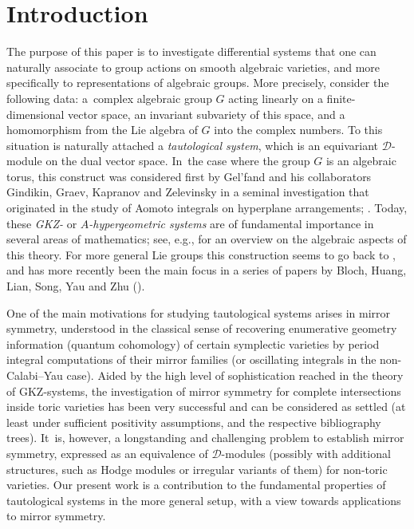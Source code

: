 \section{Introduction} \label{sec:intro}

The purpose of this paper is to investigate differential systems that
one can naturally associate to group actions on smooth algebraic
varieties, and more specifically to representations of algebraic
groups. More precisely, consider
the following data: a~complex algebraic group $G$
acting linearly on a finite-dimensional vector space, an invariant
subvariety of this space, and a homomorphism from the Lie algebra of
$G$ into the complex numbers. To this situation is naturally
attached a \emph{tautological system}, which is an equivariant
$\mathscr{D}$\nobreakdash-mod\-ule on the dual vector space. In~the case where the group $G$
is an algebraic torus, this construct
was considered first by Gel'fand and his collaborators
Gindikin, Graev, Kapranov and Zelevinsky in a seminal investigation
that originated in the study of Aomoto integrals on hyperplane
arrangements; \cf \cite{GGG80,GG86,GZ86,GGZ87,GKZ89,GKZ90}. Today,
these \emph{GKZ-} or \emph{$A$-hypergeometric systems} are of
fundamental importance in several areas of mathematics; see, e.g.,
\cite{GKZReview} for an overview on the algebraic aspects of this
theory.
For more general Lie groups this construction seems to
go back to \cite[\S II.4]{Hot98}, and has more recently been the
main focus in a series of papers by Bloch, Huang, Lian, Song, Yau and
Zhu (\cite{TautPeriod1, Bloch_HolRankProb, TautPeriod2,
HuangLianZhu}).

One of the main motivations for studying
tautological systems arises in mirror symmetry, understood in the
classical sense of recovering enumerative geometry information (\ie quantum cohomology) of certain symplectic varieties by period integral
computations of their mirror families (or oscillating integrals in the
non-Calabi--Yau case). Aided by the high level of
sophistication reached in the theory of GKZ-systems, the
investigation of mirror symmetry for
complete intersections inside toric varieties has been very
successful and can be considered as
settled (at least under sufficient positivity assumptions, \cf \cite{Giv7, Iritani, RS12} and the respective bibliography trees). It~is, however, a longstanding and
challenging problem to establish mirror symmetry, expressed as an
equivalence of $\mathscr{D}$\nobreakdash-mod\-ules (possibly with additional
structures, such as Hodge modules or irregular variants of them) for
non-toric varieties. Our present work is a contribution to the
fundamental properties of tautological systems in the more general
setup, with a view towards applications to mirror symmetry.

